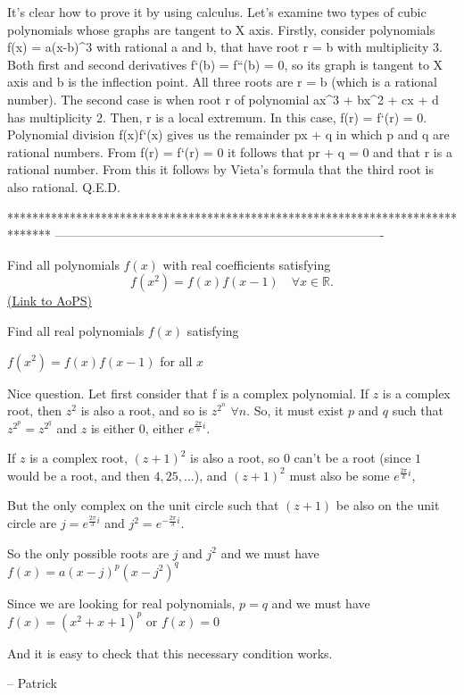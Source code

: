 \begin{solution}
	It's clear how to prove it by using calculus. Let's examine two types of cubic polynomials whose graphs are tangent to X axis. Firstly, consider polynomials f(x) = a(x-b)^3 with rational a and b, that have root r = b with multiplicity 3. Both first and second derivatives f`(b) = f``(b) = 0, so its graph is tangent to X axis and b is the inflection point. All three roots are r = b (which is a rational number). 
The second case is when root r of polynomial ax^3 + bx^2 + cx + d has multiplicity 2. Then, r is a local extremum. In this case, f(r) = f`(r) = 0. Polynomial division f(x)\/f`(x) gives us the remainder px + q in which p and q are rational numbers. From f(r) = f`(r) = 0 it follows that pr + q = 0 and that r is a rational number. From this it follows by Vieta's formula that the third root is also rational. Q.E.D.
\end{solution}
*******************************************************************************
-------------------------------------------------------------------------------

\begin{problem}
	Find all polynomials $f(x)$ with real coefficients satisfying
\[f(x^{2})=f(x)f(x-1) \quad \forall x \in \mathbb R.\]
	\flushright \href{https://artofproblemsolving.com/community/c6h151076}{(Link to AoPS)}
\end{problem}



\begin{solution}
	\begin{tcolorbox}Find all real polynomials $f(x)$ satisfying

$f(x^{2})=f(x)f(x-1)$ for all $x$\end{tcolorbox}

Nice question.
Let first consider that f is a complex polynomial.
If $z$ is a complex root, then $z^{2}$ is also a root, and so is $z^{2^{n}}$ $\forall n$. So, it must exist $p$ and $q$ such that  $z^{2^{p}}=z^{2^{q}}$  and $z$ is either $0$, either $e^{\frac{2\pi}{n}i}$.

If $z$ is a complex root, $(z+1)^{2}$ is also a root, so $0$ can't be a root (since $1$ would be a root, and then $4, 25, ...$), and $(z+1)^{2}$ must also be some $e^{\frac{2\pi}{k}i}$, 

But the only complex on the unit circle such that $(z+1)$ be also on the unit circle are $j=e^{\frac{2\pi}{3}i}$ and $j^{2}=e^{-\frac{2\pi}{3}i}$.

So the only possible roots are $j$ and $j^{2}$ and we must have $f(x)=a(x-j)^{p}(x-j^{2})^{q}$

Since we are looking for real polynomials, $p=q$ and we must have $f(x)=(x^{2}+x+1)^{p}$ or $f(x)=0$

And it is easy to check that this necessary condition works.

-- 
Patrick
\end{solution}



